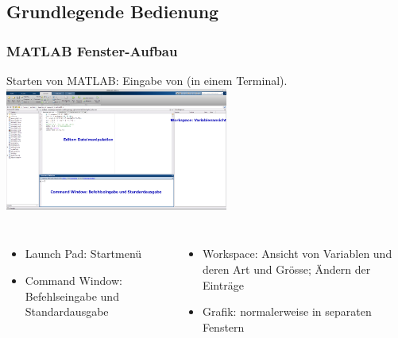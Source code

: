 \documentclass[hyperref={xetex}]{beamer}
\begin{document}
\subsection{Grundlegende Bedienung}
\begin{frame}[fragile]\frametitle{MATLAB Fenster-Aufbau}
Starten von MATLAB: Eingabe von  (in einem Terminal).
\centering\includegraphics[width=0.55\textwidth]{figures/Screenshot-MATLAB}

\begin{columns}[c]
\begin{itemize}
\item \alert{Launch Pad:} Startmenü
\item \alert{Command Window:} Befehlseingabe und Standardausgabe
\end{itemize}
\begin{itemize}
\item \alert{Workspace:} Ansicht von Variablen und deren Art und Grösse; Ändern der
Einträge 
\item \alert{Grafik:} normalerweise in separaten Fenstern
\end{itemize}

\end{columns}
\end{frame}
\end{document}
